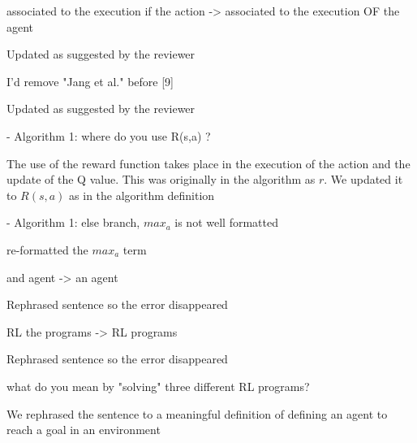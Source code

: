 \begin{remark} 
associated to the execution if the action -> associated to the execution OF the agent
\end{remark}
\begin{solved}
Updated as suggested by the reviewer
\end{solved}

\begin{remark}
I'd remove "Jang et al." before [9]
\end{remark}
\begin{solved}
Updated as suggested by the reviewer
\end{solved}

\begin{remark}
- Algorithm 1: where do you use R(s,a) ?
\end{remark}
\begin{solved}
The use of  the reward function takes place in the execution of the action and the update of the Q value. This was originally in the algorithm as $r$. We updated it to $R(s,a)$ as in the algorithm definition
\end{solved}

\begin{remark}
- Algorithm 1: else branch, $max_a$ is not well formatted
\end{remark}
\begin{solved}
re-formatted the $max_a$ term
\end{solved}

\begin{remark}
and agent -> an agent
\end{remark}
\begin{solved}
Rephrased sentence so the error disappeared 
\end{solved}

\begin{remark}
RL the programs -> RL programs
\end{remark}
\begin{solved}
Rephrased sentence so the error disappeared 
\end{solved}

\begin{remark}
what do you mean by "solving" three different RL programs?
\end{remark}
\begin{solved}
We rephrased the sentence to a meaningful definition of defining an agent to reach a goal in an environment
\end{solved}

